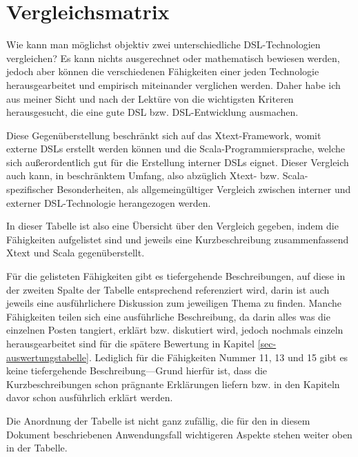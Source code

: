 \section{Vergleichsmatrix}\label{sec-vergleichsmatrix}


Wie kann man möglichst objektiv zwei unterschiedliche DSL-Technologien
vergleichen? Es kann nichts ausgerechnet oder mathematisch bewiesen werden,
jedoch aber können die verschiedenen Fähigkeiten einer jeden Technologie
herausgearbeitet und empirisch miteinander verglichen werden.
Daher habe ich aus meiner Sicht und nach der Lektüre von
\cite{dsls} die wichtigsten Kriteren herausgesucht, die eine gute DSL
bzw. DSL-Entwicklung ausmachen.

Diese Gegenüberstellung beschränkt sich auf das Xtext-Framework, womit
externe DSLs erstellt werden können und die Scala-Programmiersprache,
welche sich außerordentlich gut für die Erstellung interner DSLs eignet.
Dieser Vergleich auch kann, in beschränktem Umfang, also abzüglich
Xtext- bzw. Scala-spezifischer Besonderheiten, als allgemeingültiger
Vergleich zwischen interner und externer DSL-Technologie herangezogen werden.

In dieser Tabelle ist also eine Übersicht über den Vergleich gegeben, indem
die Fähigkeiten aufgelistet sind und jeweils eine Kurzbeschreibung
zusammenfassend Xtext und Scala gegenüberstellt.

Für die gelisteten Fähigkeiten gibt es
tiefergehende Beschreibungen, auf diese
in der zweiten Spalte der Tabelle entsprechend referenziert wird, darin
ist auch jeweils eine ausführlichere Diskussion zum jeweiligen Thema zu finden.
Manche Fähigkeiten teilen sich eine ausführliche Beschreibung, da darin
alles was die einzelnen Posten tangiert, erklärt bzw. diskutiert wird, jedoch
nochmals einzeln herausgearbeitet sind für die spätere Bewertung in
Kapitel \ref{sec-auswertungstabelle}.
Lediglich für die Fähigkeiten Nummer 11, 13 und 15 gibt es keine
tiefergehende Beschreibung---Grund hierfür ist, dass
die Kurzbeschreibungen schon prägnante Erklärungen liefern bzw. in den
Kapiteln davor schon ausführlich erklärt werden.

Die Anordnung der Tabelle ist nicht ganz zufällig, die für den in diesem
Dokument beschriebenen Anwendungsfall wichtigeren Aspekte stehen weiter oben
in der Tabelle.

